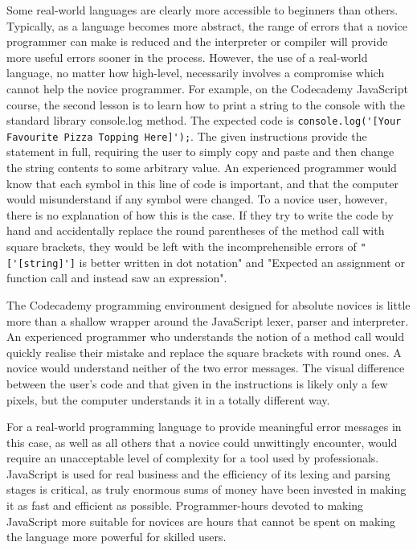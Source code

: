 Some real-world languages are clearly more accessible to beginners than others. Typically, as a language becomes more abstract, the range of errors that a novice programmer can make is reduced and the interpreter or compiler will provide more useful errors sooner in the process. However, the use of a real-world language, no matter how high-level, necessarily involves a compromise which cannot help the novice programmer. For example, on the Codecademy JavaScript course, the second lesson is to learn how to print a string to the console with the standard library console.log method. The expected code is \verb+console.log('[Your Favourite Pizza Topping Here]');+. The given instructions provide the statement in full, requiring the user to simply copy and paste and then change the string contents to some arbitrary value. An experienced programmer would know that each symbol in this line of code is important, and that the computer would misunderstand if any symbol were changed. To a novice user, however, there is no explanation of how this is the case. If they try to write the code by hand and accidentally replace the round parentheses of the method call with square brackets, they would be left with the incomprehensible errors of \verb+"['[string]']+ is better written in dot notation" and "Expected an assignment or function call and instead saw an expression".

The Codecademy programming environment designed for absolute novices is little more than a shallow wrapper around the JavaScript lexer, parser and interpreter. An experienced programmer who understands the notion of a method call would quickly realise their mistake and replace the square brackets with round ones. A novice would understand neither of the two error messages. The visual difference between the user's code and that given in the instructions is likely only a few pixels, but the computer understands it in a totally different way.

For a real-world programming language to provide meaningful error messages in this case, as well as all others that a novice could unwittingly encounter, would require an unacceptable level of complexity for a tool used by professionals. JavaScript is used for real business and the efficiency of its lexing and parsing stages is critical, as truly enormous sums of money have been invested in making it as fast and efficient as possible. Programmer-hours devoted to making JavaScript more suitable for novices are hours that cannot be spent on making the language more powerful for skilled users.

